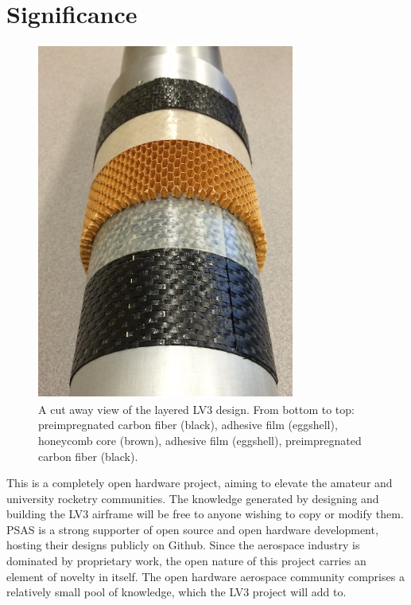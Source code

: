 \documentclass{aiaa-tc}%
\begin{document}
\section{Significance}
\begin{figure}
\centering
\includegraphics[width=\linewidth]{img/layers.png}
\caption{A cut away view of the layered LV3 design. From bottom to top: preimpregnated carbon fiber (black), adhesive film (eggshell), honeycomb core (brown), adhesive film (eggshell), preimpregnated carbon fiber (black).}
\label{fig:layers}
\end{figure}

This is a completely open hardware project, aiming to elevate the amateur and university rocketry communities. The knowledge generated by designing and building the LV3 airframe will be free to anyone wishing to copy or modify them. 
PSAS is a strong supporter of open source and open hardware development, hosting their designs publicly on Github.
Since the aerospace industry is dominated by proprietary work, the open nature of this project carries an element of novelty in itself. The open hardware aerospace community comprises a relatively small pool of knowledge, which the LV3 project will add to. 
\end{document}
